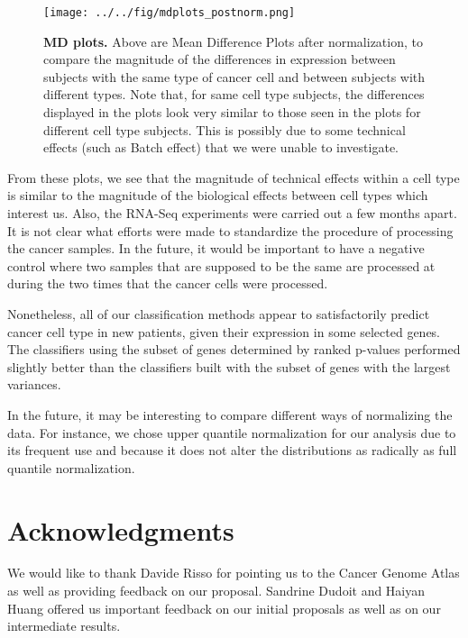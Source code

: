 \begin{figure}[H]
  \centering
    \texttt{[image: ../../fig/mdplots\_postnorm.png]}
\caption{\textbf{MD plots.} Above are Mean Difference Plots after normalization, to
  compare the magnitude of the differences in expression between subjects with
  the same type of cancer cell and between subjects with different types.  Note
  that, for same cell type subjects, the differences displayed in the plots look
  very similar to those seen in the plots for different cell type subjects. This
  is possibly due to some technical effects (such as Batch
  effect) that we were unable to investigate.}
   \label{fig:mdplot}
\end{figure}


From these plots, we see that the magnitude of technical effects within a cell
type is similar to the magnitude of the biological effects between cell types
which interest us. Also, the RNA-Seq experiments were carried out a few months
apart. It is not clear what efforts were made to standardize the procedure of
processing the cancer samples. In the future, it would be important to have a
negative control where two samples that are supposed to be the same are
processed at during the two times that the cancer cells were processed. 

Nonetheless, all of our classification methods appear to satisfactorily predict
cancer cell type in new patients, given their expression in some selected
genes. The classifiers using the subset of genes determined by ranked p-values
performed slightly better than the classifiers built with the subset of genes
with the largest variances.

In the future,  it may be interesting to compare different ways of normalizing
the data. For instance, we chose upper quantile normalization for our analysis
due to its frequent use and because it does not alter the distributions as
radically as full quantile normalization.


\section*{Acknowledgments}

We would like to thank Davide Risso for pointing us to the Cancer Genome Atlas
as well as providing feedback on our proposal. Sandrine Dudoit and Haiyan Huang
offered us important feedback on our initial proposals as well as on our
intermediate results. 





